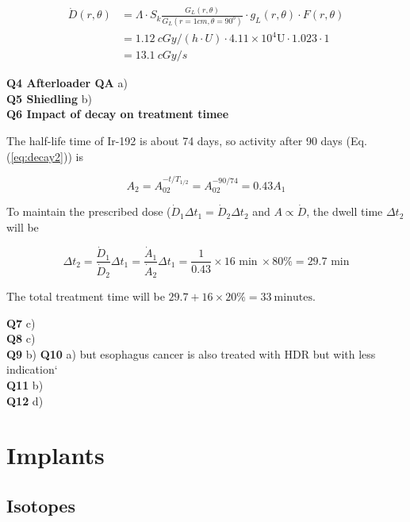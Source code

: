 \documentclass[]{book}
\theoremstyle{definition}
\theoremstyle{definition}
\theoremstyle{definition}
\theoremstyle{remark}
\begin{document}
\begin{equation}
\begin{aligned}
   \dot D(r, \theta) &= \Lambda\cdot S_k \frac{G_L(r, \theta)}{G_L(r=1cm,\theta=90^o)} \cdot g_L(r, \theta)\cdot F(r,\theta)\\
   &=1.12\ cGy/(h\cdot U)\cdot4.11\times10^4\text{U}\cdot1.023\cdot1\\
   &=\boxed{13.1\ cGy/s}
\end{aligned}
\end{equation}

\textbf{Q4 Afterloader QA} a)\\
\textbf{Q5 Shiedling} b)\\
\textbf{Q6 Impact of decay on treatment timee}

The half-life time of Ir-192 is about 74 days, so activity after 90 days
(Eq. (\eqref{eq:decay2})) is

\begin{equation*}
    A_2 = A_02^{-t/T_{1/2}}=A_02^{-90/74}=0.43A_1
\end{equation*}

To maintain the prescribed dose
(\(\dot D_1 \Delta t_1 = \dot D_2 \Delta t_2\) and \(A \propto \dot D\),
the dwell time \(\Delta t_2\) will be

\begin{equation*} 
{\Delta t_2 = \frac{\dot D_1}{\dot D_2} \Delta t_1 = \frac{\dot A_1}{\dot A_2} \Delta t_1 = \frac{1}{0.43}\times 16 \text{ min} \ \times 80\% = \boxed{29.7 \text{ min}}}
\end{equation*}

The total treatment time will be
\(29.7 + 16\times20\%=\boxed{33\ \text{minutes}}\).

\textbf{Q7} c)\\
\textbf{Q8} c)\\
\textbf{Q9} b) \textbf{Q10} a) but esophagus cancer is also treated with
HDR but with less indication`\\
\textbf{Q11} b)\\
\textbf{Q12} d)

\chapter{Implants}\label{implants}

\section{Isotopes}\label{isotopes-1}
\end{document}

